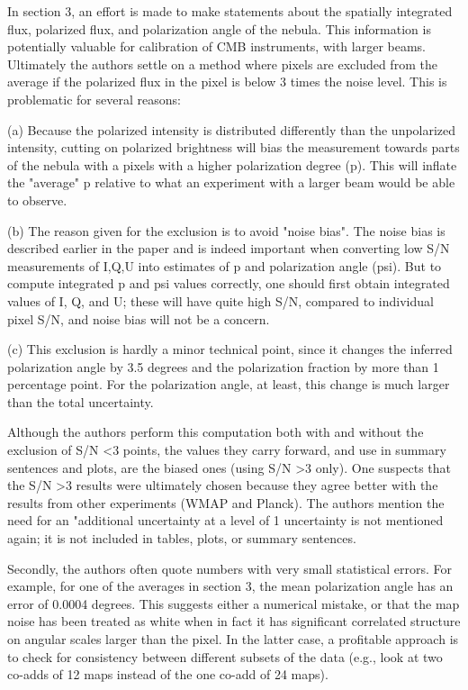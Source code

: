 \documentclass[12pt]{article}
\begin{document}
\begin{enumerate}
In section 3, an effort is made to make statements about the spatially
integrated flux, polarized flux, and polarization angle of the nebula.
This information is potentially valuable for calibration of CMB
instruments, with larger beams. Ultimately the authors settle on a
method where pixels are excluded from the average if the polarized
flux in the pixel is below 3 times the noise level. This is
problematic for several reasons:

(a) Because the polarized intensity is distributed differently than
the unpolarized intensity, cutting on polarized brightness will bias
the measurement towards parts of the nebula with a pixels with a
higher polarization degree (p). This will inflate the "average" p
relative to what an experiment with a larger beam would be able to
observe.

(b) The reason given for the exclusion is to avoid "noise bias". The
noise bias is described earlier in the paper and is indeed important
when converting low S/N measurements of I,Q,U into estimates of p and
polarization angle (psi). But to compute integrated p and psi values
correctly, one should first obtain integrated values of I, Q, and U;
these will have quite high S/N, compared to individual pixel S/N, and
noise bias will not be a concern.

(c) This exclusion is hardly a minor technical point, since it changes
the inferred polarization angle by 3.5 degrees and the polarization
fraction by more than 1 percentage point. For the polarization angle,
at least, this change is much larger than the total uncertainty.

Although the authors perform this computation both with and without
the exclusion of S/N \textless 3 points, the values they carry forward, and
use in summary sentences and plots, are the biased ones (using S/N \textgreater 3
only). One suspects that the S/N \textgreater 3 results were ultimately chosen
because they agree better with the results from other experiments
(WMAP and Planck). The authors mention the need for an "additional
uncertainty at a level of 1%
uncertainty is not mentioned again; it is not included in tables,
plots, or summary sentences.


Secondly, the authors often quote numbers with very small statistical
errors. For example, for one of the averages in section 3, the mean
polarization angle has an error of 0.0004 degrees. This suggests
either a numerical mistake, or that the map noise has been
treated as white when in fact it has significant correlated structure
on angular scales larger than the pixel. In the latter case, a
profitable approach is to check for consistency between different
subsets of the data (e.g., look at two co-adds of 12 maps instead of
the one co-add of 24 maps).


\end{enumerate}
\end{document}

